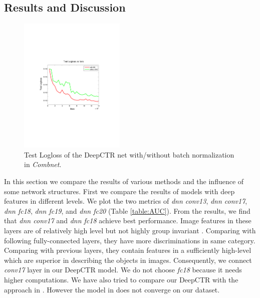 \documentclass{sig-alternate}
\begin{document}
\subsection{Results and Discussion}
\begin{figure}
	\centering
	\includegraphics[width=0.45\textwidth]{BN_test}
	\caption{Test Logloss of the DeepCTR net with/without batch normalization in \emph{Combnet}. }
	\label{fig:bn}
\end{figure} 
In this section we compare the results of various methods and the influence of some network structures. First we compare the results of  models with deep features in different levels. We plot the two metrics of \emph{dnn conv13}, \emph{dnn conv17}, \emph{dnn fc18}, \emph{dnn fc19}, and \emph{dnn fc20} (Table \ref{table:AUC}). From the results, we find that \emph{dnn conv17} and \emph{dnn fc18} achieve best performance. Image features in these layers are of relatively high level but not highly group invariant \cite{zeiler2014visualizing}. Comparing with following fully-connected layers, they have more discriminations in same category. Comparing with previous layers, they contain  features in a sufficiently high-level  which are superior in describing the objects in images. Consequently, we connect \emph{conv17} layer in our DeepCTR model. We do not choose \emph{fc18} because it needs higher computations. We have also tried to compare our DeepCTR with the approach in \cite{Mo:2015:IFL:2832747.2832769}. However the model in \cite{Mo:2015:IFL:2832747.2832769} does not converge on our dataset.
\end{document}
